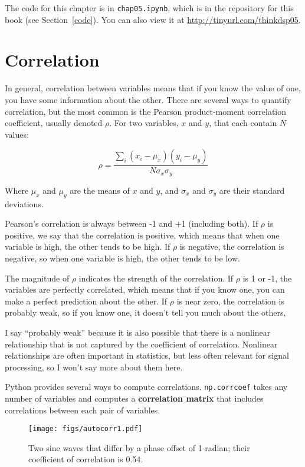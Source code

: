 \documentclass[12pt]{book} \usepackage[width=5.5in,height=8.5in, hmarginratio=3:2,vmarginratio=1:1]{geometry}
\begin{document}
The code for this chapter is in {\tt chap05.ipynb}, which is in the repository for this book (see Section~\ref{code}). You can also view it at \url{http://tinyurl.com/thinkdsp05}. 

\section{Correlation} 

In general, correlation between variables means that if you know the value of one, you have some information about the other. There are several ways to quantify correlation, but the most common is the Pearson product-moment correlation coefficient, usually denoted $\rho$. For two variables, $x$ and $y$, that each contain $N$ values: 

%
\[ \rho = \frac{ \sum_i (x_i - \mu_x) (y_i - \mu_y)}{N \sigma_x \sigma_y} \] 

%
Where $\mu_x$ and $\mu_y$ are the means of $x$ and $y$, and $\sigma_x$ and $\sigma_y$ are their standard deviations. 

Pearson's correlation is always between -1 and +1 (including both). If $\rho$ is positive, we say that the correlation is positive, which means that when one variable is high, the other tends to be high. If $\rho$ is negative, the correlation is negative, so when one variable is high, the other tends to be low. 

The magnitude of $\rho$ indicates the strength of the correlation. If $\rho$ is 1 or -1, the variables are perfectly correlated, which means that if you know one, you can make a perfect prediction about the other. If $\rho$ is near zero, the correlation is probably weak, so if you know one, it doesn't tell you much about the others, 

I say ``probably weak'' because it is also possible that there is a nonlinear relationship that is not captured by the coefficient of correlation. Nonlinear relationships are often important in statistics, but less often relevant for signal processing, so I won't say more about them here. 

Python provides several ways to compute correlations. {\tt np.corrcoef} takes any number of variables and computes a {\bf correlation matrix} that includes correlations between each pair of variables. 

\begin{figure} 

\centerline{\texttt{[image: figs/autocorr1.pdf]}} \caption{Two sine waves that differ by a phase offset of 1 radian; their coefficient of correlation is 0.54.} \label{fig.autocorr1} \end{figure} 
\end{document}
